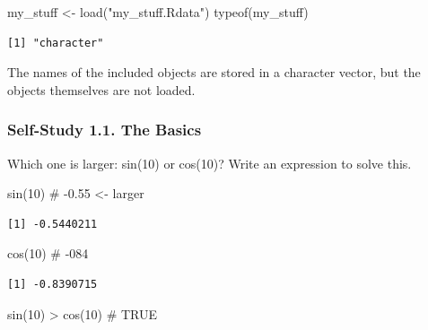 \documentclass[
  letterpaper,
  DIV=11,
  numbers=noendperiod]{scrartcl}
\newenvironment{Shaded}{\begin{snugshade}}{\end{snugshade}}
\newcommand{\CommentTok}[1]{\textcolor[rgb]{0.37,0.37,0.37}{#1}}
\newcommand{\DecValTok}[1]{\textcolor[rgb]{0.68,0.00,0.00}{#1}}
\newcommand{\FunctionTok}[1]{\textcolor[rgb]{0.28,0.35,0.67}{#1}}
\newcommand{\NormalTok}[1]{\textcolor[rgb]{0.00,0.23,0.31}{#1}}
\newcommand{\OtherTok}[1]{\textcolor[rgb]{0.00,0.23,0.31}{#1}}
\newcommand{\SpecialCharTok}[1]{\textcolor[rgb]{0.37,0.37,0.37}{#1}}
\newcommand{\StringTok}[1]{\textcolor[rgb]{0.13,0.47,0.30}{#1}}
\begin{document}
\begin{Shaded}
\begin{Highlighting}[]
\NormalTok{my\_stuff }\OtherTok{\textless{}{-}} \FunctionTok{load}\NormalTok{(}\StringTok{"my\_stuff.Rdata"}\NormalTok{)}
\FunctionTok{typeof}\NormalTok{(my\_stuff)}
\end{Highlighting}
\end{Shaded}

\begin{verbatim}
[1] "character"
\end{verbatim}

The names of the included objects are stored in a character vector, but
the objects themselves are not loaded.

\hypertarget{self-study-1.1.-the-basics}{%
\subsubsection{Self-Study 1.1. The
Basics}\label{self-study-1.1.-the-basics}}

Which one is larger: sin(10) or cos(10)? Write an expression to solve
this.

\begin{Shaded}
\begin{Highlighting}[]
\FunctionTok{sin}\NormalTok{(}\DecValTok{10}\NormalTok{) }\CommentTok{\# {-}0.55 \textless{}{-} larger}
\end{Highlighting}
\end{Shaded}

\begin{verbatim}
[1] -0.5440211
\end{verbatim}

\begin{Shaded}
\begin{Highlighting}[]
\FunctionTok{cos}\NormalTok{(}\DecValTok{10}\NormalTok{) }\CommentTok{\# {-}084}
\end{Highlighting}
\end{Shaded}

\begin{verbatim}
[1] -0.8390715
\end{verbatim}

\begin{Shaded}
\begin{Highlighting}[]
\FunctionTok{sin}\NormalTok{(}\DecValTok{10}\NormalTok{) }\SpecialCharTok{\textgreater{}} \FunctionTok{cos}\NormalTok{(}\DecValTok{10}\NormalTok{) }\CommentTok{\# TRUE}
\end{Highlighting}
\end{Shaded}
\end{document}
